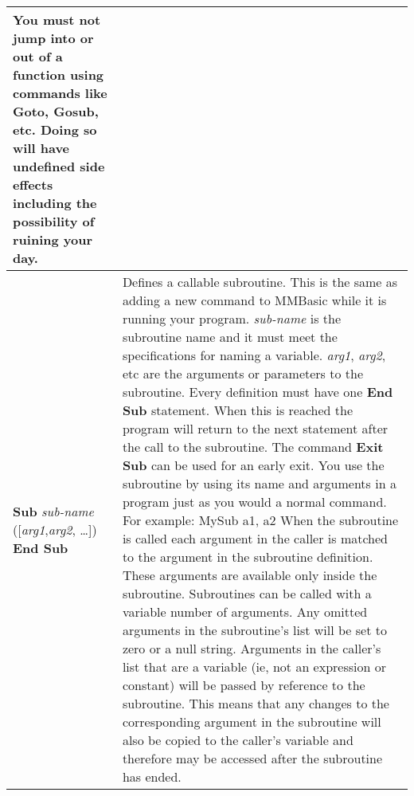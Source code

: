 \begin{table}[]
\begin{tabular}{|p{4cm}|p{10cm}|}
You must not jump into or out of a function using commands like
\textbf{Goto}, \textbf{Gosub}, etc. Doing so will have undefined side effects
including the possibility of ruining your day.
\\ \hline
\textbf{Sub} \textit{sub-name} ([\textit{arg1},\textit{arg2}, …])\newline
\textbf{End Sub}
& Defines a callable subroutine. This is the same as adding a new
command to MMBasic while it is running your program.\newline
\textit{sub-name} is the subroutine name and it must meet the specifications for
naming a variable. \textit{arg1}, \textit{arg2}, etc are the arguments or parameters to
the subroutine.\newline
Every definition must have one \textbf{End Sub} statement. When this is
reached the program will return to the next statement after the call to the
subroutine. The command \textbf{Exit Sub} can be used for an early exit.
You use the subroutine by using its name and arguments in a program
just as you would a normal command. \newline
For example: \newline
MySub a1, a2\newline
When the subroutine is called each argument in the caller is matched to
the argument in the subroutine definition. These arguments are available
only inside the subroutine. Subroutines can be called with a variable
number of arguments. Any omitted arguments in the subroutine's list
will be set to zero or a null string.\newline
Arguments in the caller's list that are a variable (ie, not an expression or
constant) will be passed by reference to the subroutine. This means that
any changes to the corresponding argument in the subroutine will also be
copied to the caller's variable and therefore may be accessed after the
subroutine has ended. 
\\ \hline
\end{tabular}
\end{table}